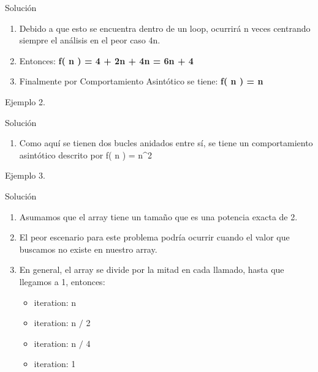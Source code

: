 \documentclass{beamer} %
\begin{document}
 \begin{frame}
  \begin{block}{Solución}
   \begin{enumerate}

     \item [7] Debido a que esto se encuentra dentro de un loop, ocurrirá n veces centrando siempre el análisis en el peor caso 4n.
     \item [8] Entonces: \textbf{f( n ) = 4 + 2n + 4n = 6n + 4}
     \item [9] Finalmente por Comportamiento Asintótico se tiene: \textbf{f( n ) = n }
   \end{enumerate}
  \end{block}
  \end{frame}

  \begin{frame}{Ejemplo 2.}

  

  \end{frame}

  \begin{frame}
   \begin{block}{Solución}
    \begin{enumerate}

      \item Como aquí se tienen dos bucles anidados entre sí, se tiene un comportamiento asintótico descrito por f( n ) = n^{2}
    \end{enumerate}
   \end{block}
   \end{frame}

   \begin{frame}{Ejemplo 3.}

   

   \end{frame}

   \begin{frame}
    \begin{block}{Solución}
     \begin{enumerate}

       \item  Asumamos que el array tiene un tamaño que es una potencia exacta de 2.
       \item El peor escenario para este problema podría ocurrir cuando el valor que buscamos no existe en nuestro array.
       \item En general, el array se divide por la mitad en cada llamado, hasta que llegamos a 1, entonces:
       \begin{itemize}
          \item [0th] iteration: n
          \item [1^{st}] iteration: {n $/$ 2}
          \item [2^{nd}] iteration: {n $/$ 4}
          \item [last] iteration: 1
       \end{itemize}

     \end{enumerate}
    \end{block}
    \end{frame}
\end{document}

